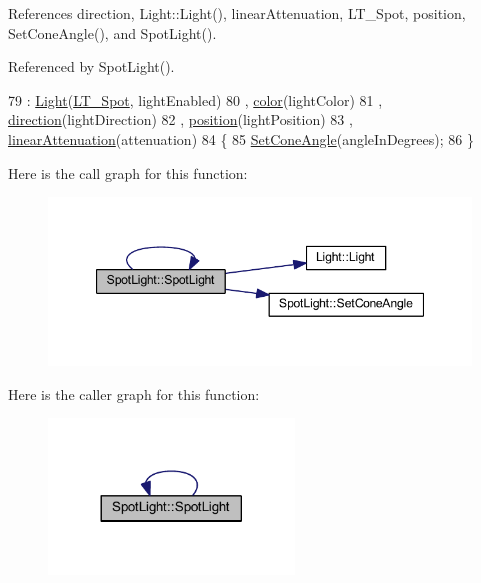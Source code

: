 References direction, Light\+::\+Light(), linear\+Attenuation, L\+T\+\_\+\+Spot, position, Set\+Cone\+Angle(), and Spot\+Light().



Referenced by Spot\+Light().


\begin{DoxyCode}
79     : \hyperlink{struct_light_a0df5e58af351bd13c996da2880be0dee}{Light}(\hyperlink{_light_8h_a3336214f41ddc8acd932fa9be957047dafc2f93ccc246fab9a52b3779c2112475}{LT\_Spot}, lightEnabled)
80     , \hyperlink{struct_spot_light_ae1426c92b7130b3a608a5aa4a0a814cb}{color}(lightColor)
81     , \hyperlink{struct_spot_light_a0cc8dadd5f22dc604538ddf849c088dc}{direction}(lightDirection)
82     , \hyperlink{struct_spot_light_a707173cf04742ea60c140e1de36dc90a}{position}(lightPosition)
83     , \hyperlink{struct_spot_light_a8c45a82ddf692a1b23c50aad68cb7dd6}{linearAttenuation}(attenuation)
84   \{
85     \hyperlink{struct_spot_light_a8c7ae45104d1e9c394717447b65a4bbd}{SetConeAngle}(angleInDegrees);
86   \}
\end{DoxyCode}


Here is the call graph for this function\+:\nopagebreak
\begin{figure}[H]
\begin{center}
\leavevmode
\includegraphics[width=347pt]{struct_spot_light_ade2739079d666cb447290e6f85404a28_cgraph}
\end{center}
\end{figure}




Here is the caller graph for this function\+:\nopagebreak
\begin{figure}[H]
\begin{center}
\leavevmode
\includegraphics[width=185pt]{struct_spot_light_ade2739079d666cb447290e6f85404a28_icgraph}
\end{center}
\end{figure}




